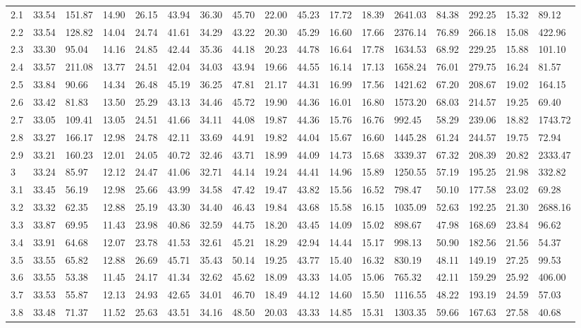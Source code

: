 \begin{adjustbox}{angle=90}
\begin{center}
{\begin{tabular}{|l|llllllllllllllll|}
2.1&33.54&151.87&14.90&26.15&43.94&36.30&45.70&22.00&45.23&17.72&18.39&2641.03&84.38&292.25&15.32&89.12  \\ 
2.2&33.54&128.82&14.04&24.74&41.61&34.29&43.22&20.30&45.29&16.60&17.66&2376.14&76.89&266.18&15.08&422.96  \\ 
2.3&33.30&95.04&14.16&24.85&42.44&35.36&44.18&20.23&44.78&16.64&17.78&1634.53&68.92&229.25&15.88&101.10  \\ 
2.4&33.57&211.08&13.77&24.51&42.04&34.03&43.94&19.66&44.55&16.14&17.13&1658.24&76.01&279.75&16.24&81.57  \\ 
2.5&33.84&90.66&14.34&26.48&45.19&36.25&47.81&21.17&44.31&16.99&17.56&1421.62&67.20&208.67&19.02&164.15  \\ 
2.6&33.42&81.83&13.50&25.29&43.13&34.46&45.72&19.90&44.36&16.01&16.80&1573.20&68.03&214.57&19.25&69.40  \\ 
2.7&33.05&109.41&13.05&24.51&41.66&34.11&44.08&19.87&44.36&15.76&16.76&992.45&58.29&239.06&18.82&1743.72  \\ 
2.8&33.27&166.17&12.98&24.78&42.11&33.69&44.91&19.82&44.04&15.67&16.60&1445.28&61.24&244.57&19.75&72.94  \\ 
2.9&33.21&160.23&12.01&24.05&40.72&32.46&43.71&18.99&44.09&14.73&15.68&3339.37&67.32&208.39&20.82&2333.47  \\ 
3&33.24&85.97&12.12&24.47&41.06&32.71&44.14&19.24&44.41&14.96&15.89&1250.55&57.19&195.25&21.98&332.82  \\ 
3.1&33.45&56.19&12.98&25.66&43.99&34.58&47.42&19.47&43.82&15.56&16.52&798.47&50.10&177.58&23.02&69.28  \\ 
3.2&33.32&62.35&12.88&25.19&43.30&34.40&46.43&19.84&43.68&15.58&16.15&1035.09&52.63&192.25&21.30&2688.16  \\ 
3.3&33.87&69.95&11.43&23.98&40.86&32.59&44.75&18.20&43.45&14.09&15.02&898.67&47.98&168.69&23.84&96.62  \\ 
3.4&33.91&64.68&12.07&23.78&41.53&32.61&45.21&18.29&42.94&14.44&15.17&998.13&50.90&182.56&21.56&54.37  \\ 
3.5&33.55&65.82&12.88&26.69&45.71&35.43&50.14&19.25&43.77&15.40&16.32&830.19&48.11&149.19&27.25&99.53  \\ 
3.6&33.55&53.38&11.45&24.17&41.34&32.62&45.62&18.09&43.33&14.05&15.06&765.32&42.11&159.29&25.92&406.00  \\ 
3.7&33.53&55.87&12.13&24.93&42.65&34.01&46.70&18.49&44.12&14.60&15.50&1116.55&48.22&193.19&24.59&57.03  \\ 
3.8&33.48&71.37&11.52&25.63&43.51&34.16&48.50&20.03&43.33&14.85&15.31&1303.35&59.66&167.63&27.58&40.68  \\ 

\end{tabular}}
\end{center}
\end{adjustbox}
